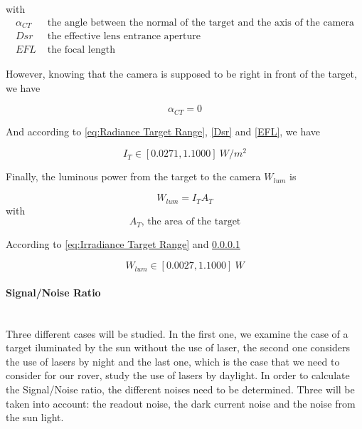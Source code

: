 with
\begin{align*}
\alpha_{CT} & \mbox{ the angle between the normal of the target and the axis of the camera} \\
Dsr & \mbox{ the effective lens entrance aperture} \\
EFL & \mbox{ the focal length}
\end{align*}

However, knowing that the camera is supposed to be right in front of the target, we have

\begin{equation*}
\alpha_{CT} = 0
\end{equation*}

And according to \eqref{eq:Radiance Target Range}, \ref{Dsr} and \ref{EFL}, we have

\begin{equation}
\label{eq:Irradiance Target Range}
I_T \in [0.0271, 1.1000] \ W/m^2
\end{equation}

Finally, the luminous power from the target to the camera $W_{lum}$ is 

\begin{equation}
\label{eq:Luminous Power}
W_{lum} = I_TA_T
\end{equation}
with
\begin{equation*}
A_T \mbox{, the area of the target}
\end{equation*}

According to \eqref{eq:Irradiance Target Range} and \ref{}

\begin{equation}
\label{eq:Luminous Power Range}
W_{lum} \in [0.0027, 1.1000] \ W
\end{equation}

\paragraph{Signal/Noise Ratio}
~\\
Three different cases will be studied. In the first one, we examine the case of a target iluminated by the sun without the use of laser, the second one considers the use of lasers by night and the last one, which is the case that we need to consider for our rover, study the use of lasers by daylight.
In order to calculate the Signal/Noise ratio, the different noises need to be determined. Three will be taken into account: the readout noise, the dark current noise and the noise from the sun light. 

